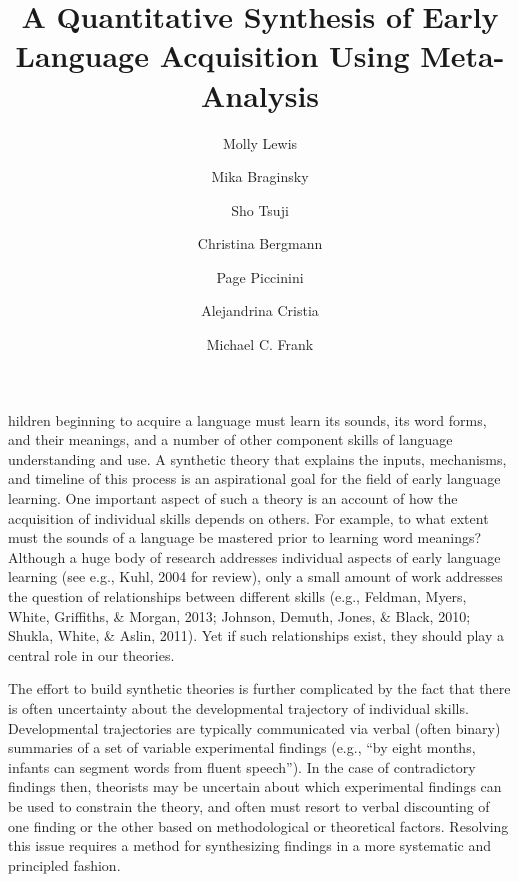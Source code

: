 \documentclass[9pt,twocolumn,twoside,lineno]{pnas-new}
\title{A Quantitative Synthesis of Early Language Acquisition Using Meta-Analysis}
\author[a,1]{ Molly Lewis}
\author[b]{Mika Braginsky}
\author[c]{Sho Tsuji}
\author[c]{Christina Bergmann}
\author[d]{Page Piccinini}
\author[c]{Alejandrina Cristia}
\author[a]{Michael C. Frank}
\affil[a]{Department of Psychology, Stanford University}
\affil[b]{Department of Brain and Cognitive Sciences, MIT}
\affil[c]{Laboratoire de Sciences Cognitives et Psycholinguistique, ENS}
\affil[d]{ NeuroPsychologie Interventionnelle, ENS }
\begin{document}
\verticaladjustment{-2pt}

\maketitle
\thispagestyle{firststyle}

hildren beginning to acquire a language must learn its sounds, its word
forms, and their meanings, and a number of other component skills of
language understanding and use. A synthetic theory that explains the
inputs, mechanisms, and timeline of this process is an aspirational goal
for the field of early language learning. One important aspect of such a
theory is an account of how the acquisition of individual skills depends
on others. For example, to what extent must the sounds of a language be
mastered prior to learning word meanings? Although a huge body of
research addresses individual aspects of early language learning (see
e.g., Kuhl, 2004 for review), only a small amount of work addresses the
question of relationships between different skills (e.g., Feldman,
Myers, White, Griffiths, \& Morgan, 2013; Johnson, Demuth, Jones, \&
Black, 2010; Shukla, White, \& Aslin, 2011). Yet if such relationships
exist, they should play a central role in our theories.

The effort to build synthetic theories is further complicated by the
fact that there is often uncertainty about the developmental trajectory
of individual skills. Developmental trajectories are typically
communicated via verbal (often binary) summaries of a set of variable
experimental findings (e.g., \enquote{by eight months, infants can
segment words from fluent speech}). In the case of contradictory
findings then, theorists may be uncertain about which experimental
findings can be used to constrain the theory, and often must resort to
verbal discounting of one finding or the other based on methodological
or theoretical factors. Resolving this issue requires a method for
synthesizing findings in a more systematic and principled fashion.
\end{document}
